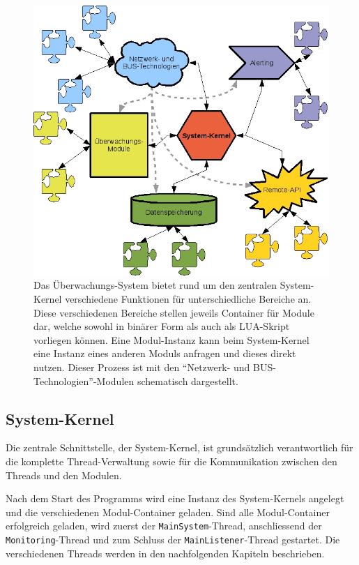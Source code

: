 \begin{figure}[h]
  \centering
  \includegraphics[width=0.8\linewidth]{images/theorie/Aufbau_Grundsystem}
  \caption[Aufbau der \"Uberwachungs-Software]{Das \"Uberwachungs-System bietet rund um den zentralen System-Kernel verschiedene Funktionen f\"ur unterschiedliche Bereiche an. Diese verschiedenen Bereiche stellen jeweils Container f\"ur Module dar, welche sowohl in bin\"arer Form als auch als LUA-Skript vorliegen k\"onnen. Eine Modul-Instanz kann beim System-Kernel eine Instanz eines anderen Moduls anfragen und dieses direkt nutzen. Dieser Prozess ist mit den "`Netzwerk- und BUS-Technologien"'-Modulen schematisch dargestellt.}
  \label{fig:praxis-aufbau}
\end{figure}

\subsection{System-Kernel} \label{sec:praxis-basis-kernel}
Die zentrale Schnittstelle, der System-Kernel, ist grunds\"atzlich verantwortlich f\"ur die komplette Thread-Verwaltung sowie f\"ur die Kommunikation zwischen den Threads und den Modulen.

Nach dem Start des Programms wird eine Instanz des System-Kernels angelegt und die verschiedenen Modul-Container geladen. Sind alle Modul-Container erfolgreich geladen, wird zuerst der \texttt{MainSystem}-Thread, anschliessend der \texttt{Monitoring}-Thread und zum Schluss der \texttt{MainListener}-Thread gestartet. Die verschiedenen Threads werden in den nachfolgenden Kapiteln beschrieben.

